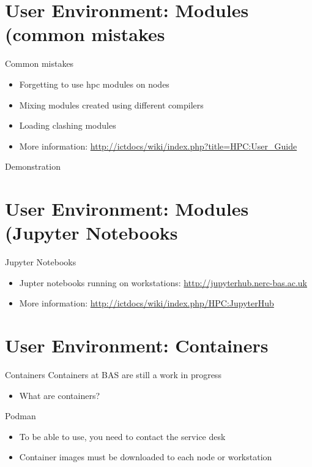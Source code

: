 {
\section{User Environment: Modules (common mistakes}
%
\begin{frame}{Common mistakes}
\begin{itemize}
\item Forgetting to use hpc modules on nodes
\item Mixing modules created using different compilers
\item Loading clashing modules
\item More information: \href{http://ictdocs/wiki/index.php?title=HPC:User_Guide}{http://ictdocs/wiki/index.php?title=HPC:User_Guide}
\end{itemize}
\item{{\color{red}Demonstration}}
\end{frame}
}

{
\section{User Environment: Modules (Jupyter Notebooks}
%
\begin{frame}{Jupyter Notebooks}
\begin{itemize}
\item Jupter notebooks running on workstations: \href{http://jupyterhub.nerc-bas.ac.uk}{http://jupyterhub.nerc-bas.ac.uk}
\item More information: \href{http://ictdocs/wiki/index.php/HPC:JupyterHub}{http://ictdocs/wiki/index.php/HPC:JupyterHub}
\end{itemize}
\end{frame}
}

{
\section{User Environment: Containers}
%
\begin{frame}{Containers}
\text Containers at BAS are still a work in progress
\begin{itemize}
\item What are containers?
\end{itemize}
\text Podman
\begin{itemize}
\item To be able to use, you need to contact the service desk
\item Container images must be downloaded to each node or workstation
\end{itemize}
\end{frame}
}

